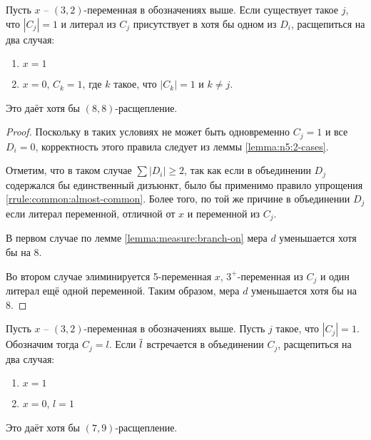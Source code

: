 \begin{brule}
 Пусть $x$ -- $(3,2)$-переменная в обозначениях выше. Если существует такое $j$, что $|C_j| = 1$ и литерал из $C_j$ присутствует в хотя бы одном из $D_i$, расщепиться на два случая:

 \begin{enumerate}
  \item $x = 1$
  \item $x = 0$, $C_k = 1$, где $k$ такое, что $|C_k| = 1$ и $k \neq j$.
 \end{enumerate}

 Это даёт хотя бы $(8,8)$-расщепление.
 \label{brule:n5:32-rest:same}
\end{brule}

\begin{proof}
 Поскольку в таких условиях не может быть одновременно $C_j = 1$ и все $D_i = 0$, корректность этого правила следует из леммы \ref{lemma:n5:2-cases}.

 Отметим, что в таком случае $\sum |D_i| \geq 2$, так как если в объединении $D_j$ содержался бы единственный дизъюнкт, было бы применимо правило упрощения \ref{rrule:common:almost-common}. Более того, по той же причине в объединении $D_j$ если литерал переменной, отличной от $x$ и переменной из $C_j$.

 В первом случае по лемме \ref{lemma:measure:branch-on} мера $d$ уменьшается хотя бы на 8.

 Во втором случае элиминируется 5-переменная $x$, $3^+$-переменная из $C_j$ и один литерал ещё одной переменной. Таким образом, мера $d$ уменьшается хотя бы на 8.
\end{proof}

\begin{brule}
 Пусть $x$ -- $(3,2)$-переменная в обозначениях выше. Пусть $j$ такое, что $|C_j| = 1$. Обозначим тогда $C_j = l$. Если $\overline{l}$ встречается в объединении $C_j$, расщепиться на два случая:

 \begin{enumerate}
  \item $x = 1$
  \item $x = 0$, $l = 1$
 \end{enumerate}
 
 Это даёт хотя бы $(7,9)$-расщепление.
 \label{brule:n5:32-rest:compl}
\end{brule}


